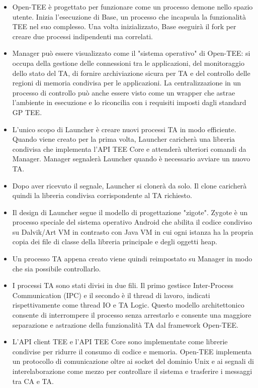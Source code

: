 \begin{itemize}
    \item Open-TEE è progettato per funzionare
come un processo demone nello
spazio utente. Inizia l'esecuzione di
Base, un processo che incapsula la
funzionalità TEE nel suo complesso.
Una volta inizializzato, Base eseguirà il
fork per creare due processi indipendenti ma correlati.
    \item Manager può essere visualizzato come il
"sistema operativo" di Open-TEE: si occupa della gestione delle connessioni tra le
applicazioni, del monitoraggio dello stato del TA, di fornire archiviazione sicura per TA e del controllo delle regioni di memoria
condivisa per le applicazioni.
La centralizzazione in un processo di
controllo può anche essere visto come
un wrapper che astrae l'ambiente in
esecuzione e lo riconcilia con i requisiti
imposti dagli standard GP TEE.
    \item L'unico scopo di Launcher è creare
nuovi processi TA in modo efficiente.
Quando viene creato per la prima
volta, Launcher caricherà una libreria
condivisa che implementa l'API TEE
Core e attenderà ulteriori comandi da
Manager. Manager segnalerà Launcher quando
è necessario avviare un nuovo TA.
    \item Dopo aver ricevuto il segnale,
Launcher si clonerà da solo. Il clone
caricherà quindi la libreria condivisa
corrispondente al TA richiesto.
\item Il design di Launcher segue il modello
di progettazione "zigote".
Zygote è un processo speciale del
sistema operativo Android che
abilita il codice condiviso su Dalvik/Art VM in contrasto con Java VM
in cui ogni istanza ha la propria
copia dei file di classe della libreria
principale e degli oggetti heap.
\item Un processo TA appena creato viene
quindi reimpostato su Manager in
modo che sia possibile controllarlo.
\item I processi TA sono stati divisi in due fili.
Il primo gestisce Inter-Process
Communication (IPC) e il secondo è il
thread di lavoro, indicati rispettivamente come thread IO e TA Logic. Questo modello architettonico
consente di interrompere il processo
senza arrestarlo e consente una
maggiore separazione e astrazione
della funzionalità TA dal framework
Open-TEE.
\item L'API client TEE e l'API TEE Core sono
implementate come librerie condivise
per ridurre il consumo di codice e
memoria. Open-TEE implementa un protocollo
di comunicazione oltre ai socket del
dominio Unix e ai segnali di interelaborazione come mezzo per
controllare il sistema e trasferire i
messaggi tra CA e TA.
\end{itemize}

